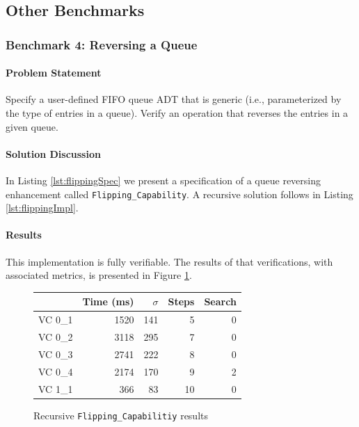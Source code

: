 \FloatBarrier
	\subsection{Other Benchmarks}

		\subsubsection{Benchmark 4: Reversing a Queue}	%

\paragraph{Problem Statement}Specify a user-defined FIFO queue ADT that is generic (i.e., parameterized by the type of entries in a queue). Verify an operation that reverses the entries in a given queue.

\paragraph{Solution Discussion}In Listing \ref{lst:flippingSpec} we present a specification of a queue reversing enhancement called \texttt{Flipping\_Capability}.  A recursive solution follows in Listing \ref{lst:flippingImpl}.






\paragraph{Results}This implementation is fully verifiable.  The results of that verifications, with associated metrics, is presented in Figure \ref{fig:flippingResults}.

\begin{figure}
	\centering
	\begin{tabular}{lrrrr}
		\toprule
			& Time (ms)	& $\sigma$& Steps & Search \\
		\midrule
		VC 0\_1	& 1520		& 141	& 5 	& 0     \\
		VC 0\_2	& 3118		& 295	& 7 	& 0     \\
		VC 0\_3	& 2741		& 222	& 8 	& 0     \\
		VC 0\_4	& 2174		& 170	& 9 	& 2     \\
		VC 1\_1	& 366		& 83	& 10	& 0     \\
		\bottomrule
	\end{tabular}
	\caption{Recursive \texttt{Flipping\_Capabilitiy} results\label{fig:flippingResults}}
\end{figure}


